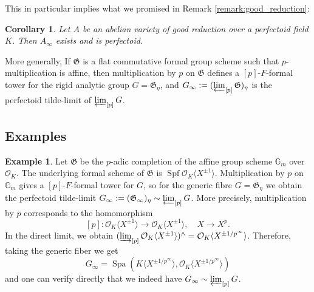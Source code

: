 \documentclass[10pt,oneside]{amsart}
\newtheorem{corollary}[theorem]{Corollary}
\theoremstyle{definition}
\newtheorem{remark}[theorem]{Remark}
\newtheorem*{example}{Example}
\begin{document}
This in particular implies what we promised in Remark \ref{remark:good_reduction}: 
	\begin{corollary}\label{tilde-limit exists and is perfectoid in the good reduction case}
		Let $A$ be an abelian variety of good reduction over a perfectoid field $K$. Then $A_\infty$ exists and is perfectoid.
	\end{corollary}
	 	
More generally, If $\mathfrak G$ is a flat commutative formal group scheme such that $p$-multiplication is affine, then multiplication by $p$ on $\mathfrak G$ defines a $[p]$-$F$-formal tower for the rigid analytic group $G=\mathfrak G_\eta$, and  $G_\infty := (\varprojlim_{[p]}\mathfrak G)_\eta$ is the perfectoid tilde-limit of $\varprojlim_{[p]} G$. 

		
\subsection{Examples}				
		
	\begin{example}
		Let $\mathfrak G$ be the $p$-adic completion of the affine group scheme $\mathbb G_m$ over $\mathcal O_K$. The underlying formal scheme of $\mathfrak G$ is $\operatorname {Spf} \mathcal O_K\langle X^{\pm 1} \rangle$.  Multiplication by $p$ on $\mathbb G_m$ gives a $[p]$-$F$-formal tower for $G$, so for the generic fibre $G=\mathfrak G_\eta$ we obtain the perfectoid tilde-limit $G_\infty := (\mathfrak G_\infty)_{\eta} \sim \varprojlim_{[p]} G$. More precisely,  multiplication by $p$ corresponds to the homomorphism
		\[[p]:\mathcal O_K\langle X^{\pm 1} \rangle\rightarrow  \mathcal O_K\langle X^{\pm 1} \rangle, \quad X\rightarrow X^{p}.\]
		In the direct limit, we obtain $   (\varinjlim_{[p]} \mathcal O_K\langle X^{\pm 1} \rangle  )^{\wedge} = \mathcal O_K\langle  X^{\pm 1/p^\infty} \rangle$.  Therefore, taking the generic fiber we get
		$$G_\infty = \operatorname{Spa}(K\langle X^{\pm 1/p^\infty} \rangle,\mathcal O_K\langle X^{\pm 1/p^\infty} \rangle)$$
		and one can verify directly that we indeed have $G_\infty \sim \varprojlim_{[p]} G$.
	\end{example}
	
\end{document}
